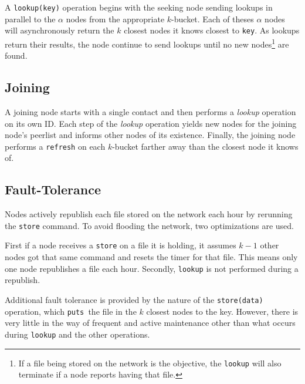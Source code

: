 A \texttt{lookup(key)} operation begins with the seeking node sending lookups in parallel to the $\alpha$ nodes from the appropriate $k$-bucket.
Each of theses $\alpha$ nodes will asynchronously return the $k$ closest nodes it knows closest to \texttt{key}.
As lookups return their results, the node continue to send lookups until no new nodes\footnote{If a file being stored on the network is the objective, the \texttt{lookup} will also terminate if a node reports having that file.} are found.  

\subsection*{Joining}
A joining node starts with a single contact and then performs a \textit{lookup} operation on its own ID.
Each step of the \textit{lookup} operation yields new nodes for the joining node's peerlist and informs other nodes of its existence.
Finally, the joining node performs a \texttt{refresh} on each $k$-bucket farther away than the closest node it knows of.




\subsection*{Fault-Tolerance}
Nodes actively republish each file stored on the network each hour by rerunning the \texttt{store} command.  
To avoid flooding the network, two optimizations are used.

First if a node receives a \texttt{store} on a file it is holding, it assumes $k-1$ other nodes got that same command and resets the timer for that file.
This means only one node republishes a file each hour.
Secondly, \texttt{lookup} is not performed during a republish.


Additional fault tolerance is provided by the nature of the \texttt{store(data)} operation, which \texttt{puts }the file in the $k$ closest nodes to the key.
However, there is very little in the way of frequent and active maintenance other than what occurs during \texttt{lookup} and the other operations.












